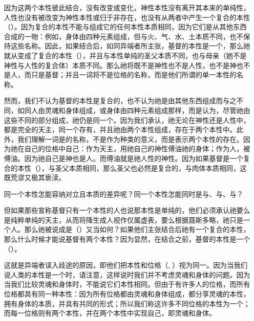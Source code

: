 因为这两个本性彼此结合，没有改变或变化，神性本性没有离开其本来的单纯性，人性也没有被改变为神性本性或归于非存在，也没有从两者中产生一个复合的本性（）。因为复合的本性不能与组成它的任何本性本质相同，因为它们是从其他东西合成的一物：例如，身体由四种元素组成，但与火、气、水、土本质不同，也不保持这些名称。因此，如果结合后，如同异端者所主张，基督的本性是一个，那么祂就从变成了复合的本性（），并且与本性单纯的圣父本质不同，也与母亲（她不是神性与人性的复合体）本质不同。那么祂将既不是神性也不是人性，也不是神也不是人，而只是基督；并且一词将不是位格的名称，而是他们所谓的单一本性的名称。\par

然而，我们不认为基督的本性是复合的，也不认为祂是由其他东西组成而与之不同，如同人由灵魂和身体组成，或身体由四种元素组成那样，而是认为，尽管祂由这些不同的部分组成，祂仍是同一个。因为我们承认，祂无论在神性还是人性中，都是完全的天主，同一个存有，并且祂由两个本性组成，存在于两个本性中。此外，我们理解一词是的名称，不是作为种类的意义，而是表示两个本性的存在。因为祂在自己的位格中自己：作为天主，用祂自己的神性傅油祂的身体；作为人，被傅油。因为祂自己是神也是人。而傅油就是祂人性的神性。因为如果基督是一个复合的本性（），与圣父本质相同，那么圣父也必然是复合的，与肉体本质相同，这既荒谬又极其亵渎。\par

同一个本性怎能容纳对立且本质的差异呢？同一个本性怎能同时是与、与、与？\par

但如果那些宣称基督只有一个本性的人也说那本性是单纯的，他们必须承认祂要么是纯粹单纯的天主，从而将降生成人视作仅属虚表，要么根据聂斯多略，祂只是一个人。那么祂被说成是（）又当如何？如果他们主张结合后祂有一个复合的本性，那么什么时候才能说基督有两个本性？因为显然，在结合之前，基督的本性是一个（）。\par

这就是异端者误入歧途的原因，即他们把本性和位格（, ）视为同一。因为当我们说人类的本性是一个时，请注意，这样说时我们并不考虑灵魂和身体的问题。因为当我们比较灵魂和身体时，不能说它们本性相同。但由于有许多人的位格，而所有位格都具有同一种本性：因为所有位格都由灵魂和身体组成，都分享灵魂的本性，拥有身体的本质，并具有共同的形式；所以我们称这许多不同位格的本性为一个；而每一位格则有两个本性，并在两个本性中实现自己，即灵魂和身体。\par

